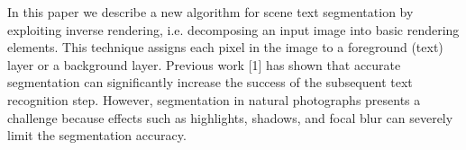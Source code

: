 In this paper we describe a new algorithm for scene text
segmentation by exploiting inverse rendering, i.e. decomposing
an input image into basic rendering elements. This technique
assigns each pixel in the image to a foreground (text) layer
or a background layer. Previous work [1] has shown that
accurate segmentation can significantly increase the success of
the subsequent text recognition step. However, segmentation in
natural photographs presents a challenge because effects such
as highlights, shadows, and focal blur can severely limit the
segmentation accuracy.

	


